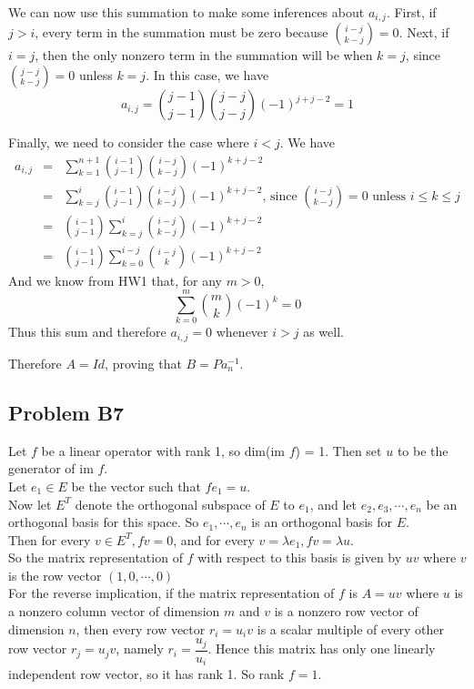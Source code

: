 \documentclass{article}
\begin{document}
We can now use this summation to make some inferences about $a_{i,j}$.
First, if $j > i$, every term in the summation must be zero because
$\binom{i-j}{k-j} = 0$.
Next, if $i = j$, then the only nonzero term in the summation will be when $k =
j$, since $\binom{j-j}{k-j} = 0$ unless $k = j$. In this case, we have
\[a_{i,j} = \binom{j-1}{j-1}\binom{j-j}{j-j}(-1)^{j+j-2} = 1\]

Finally, we need to consider the case where $i < j$. We have
\begin{eqnarray*}
a_{i,j} &=& \sum_{k=1}^{n+1} \binom{i-1}{j-1}\binom{i-j}{k-j}(-1)^{k+j-2}\\
 &=& \sum_{k=j}^{i} \binom{i-1}{j-1}\binom{i-j}{k-j}(-1)^{k+j-2}
 \textrm{, since } \binom{i-j}{k-j} = 0 \textrm{ unless } i \leq k \leq j\\
 &=& \binom{i-1}{j-1}\sum_{k=j}^{i} \binom{i-j}{k-j}(-1)^{k+j-2}\\
 &=& \binom{i-1}{j-1}\sum_{k=0}^{i-j} \binom{i-j}{k}(-1)^{k+j-2}
\end{eqnarray*}
And we know from HW1 that, for any $m > 0$,
\[ \sum_{k=0}^{m} \binom{m}{k}(-1)^k = 0\]
Thus this sum and therefore $a_{i,j} = 0$ whenever $i > j$ as well.

Therefore $A = Id$, proving that $B = Pa_n^{-1}$.

\subsection{Problem B7}
Let $f$ be a linear operator with rank 1, so dim(im $f$) = 1. Then set $u$ to be
the generator of im $f$. 
\\Let $e_1 \in E$ be the vector such that $fe_1 = u$. 
\\Now let $E^T$ denote the orthogonal subspace of $E$ to $e_1$, and let $e_2,e_3,\cdots,e_n$ be an orthogonal basis for this space. So $e_1,\cdots,e_n$ is an orthogonal basis for $E$.
\\Then for every $v \in E^T,fv=0$, and for every $v=\lambda e_1,fv=\lambda u$. 
\\So the matrix representation of $f$ with respect to this basis is given by $uv$ where $v$ is the row vector $(1,0,\cdots ,0)$
\\For the reverse implication, if the matrix representation of $f$ is $A=uv$ where $u$ is a nonzero column vector of dimension $m$ and $v$ is a nonzero row vector of dimension $n$, then every row vector $r_i = u_i v$ is a scalar multiple of every other row vector $r_j = u_j v$, namely $r_i = \dfrac{u_j}{u_i}$. Hence this matrix has only one linearly independent row vector, so it has rank 1. So rank $f = 1$. 
\end{document}
